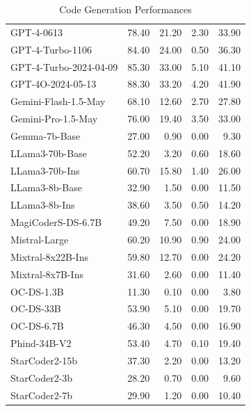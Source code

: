 \begin{table}[ht]
\begin{tabular}{lrrrr}
GPT-4-0613 & 78.40& 21.20& 2.30& 33.90\\
GPT-4-Turbo-1106 & 84.40& 24.00& 0.50& 36.30\\
GPT-4-Turbo-2024-04-09 & 85.30& 33.00& 5.10& 41.10\\
GPT-4O-2024-05-13 & 88.30& 33.20& 4.20& 41.90\\
Gemini-Flash-1.5-May & 68.10& 12.60& 2.70& 27.80\\
Gemini-Pro-1.5-May & 76.00& 19.40& 3.50& 33.00\\
Gemma-7b-Base & 27.00& 0.90& 0.00& 9.30\\
LLama3-70b-Base & 52.20& 3.20& 0.60& 18.60\\
LLama3-70b-Ins & 60.70& 15.80& 1.40& 26.00\\
LLama3-8b-Base & 32.90& 1.50& 0.00& 11.50\\
LLama3-8b-Ins & 38.60& 3.50& 0.50& 14.20\\
MagiCoderS-DS-6.7B & 49.20& 7.50& 0.00& 18.90\\
Mistral-Large & 60.20& 10.90& 0.90& 24.00\\
Mixtral-8x22B-Ins & 59.80& 12.70& 0.00& 24.20\\
Mixtral-8x7B-Ins & 31.60& 2.60& 0.00& 11.40\\
OC-DS-1.3B & 11.30& 0.10& 0.00& 3.80\\
OC-DS-33B & 53.90& 5.10& 0.00& 19.70\\
OC-DS-6.7B & 46.30& 4.50& 0.00& 16.90\\
Phind-34B-V2 & 53.40& 4.70& 0.10& 19.40\\
StarCoder2-15b & 37.30& 2.20& 0.00& 13.20\\
StarCoder2-3b & 28.20& 0.70& 0.00& 9.60\\
StarCoder2-7b & 29.90& 1.20& 0.00& 10.40\\
    \hline
    \end{tabular}
\caption{Code Generation Performances}
\end{table}

